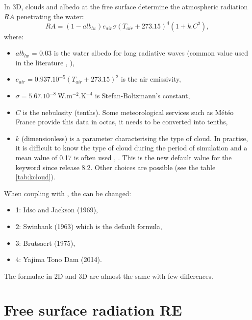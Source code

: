 In 3D, clouds and albedo at
the free surface determine the atmospheric radiation $RA$ penetrating the water:
\begin{equation*}
RA = (1-alb_{lw}) e_{air}\sigma(T_{air}+273.15)^{4}(1+k . C^{2}),
\end{equation*}
where:
\begin{itemize}
\item $alb_{lw}$ = 0.03 is the water albedo for long radiative waves
  (common value used in the literature \cite{imerito_dyresm_2007},
  \cite{henderson-sellers_energy_balance_1986}),
\item $e_{air} = 0.937.10^{-5}(T_{air}+273.15)^{2}$ is the air emissivity,
\item $\sigma= 5.67.10^{-8}~\mathrm{{W.m^{-2}.K^{-4}}}$ is Stefan-Boltzmann's constant,
\item $C$ is the nebulosity (tenths). Some meteorological services such as
M\'{e}t\'{e}o France provide this data in octas, it needs to be converted
into tenths,
\item $k$ (dimensionless) is a parameter characterising the type of
cloud. In practise, it is difficult to know the type of cloud during the
period of simulation and a mean value of 0.17 is often used \cite{tva_heat_1972},
\cite{imerito_dyresm_2007}.
This is the new default value for the keyword
 since release 8.2.
Other choices are possible
(see the table \ref{tab:kcloud}).
\end{itemize}

When coupling \waqtel with , the 
can be changed:
\begin{itemize}
\item 1: Idso and Jackson (1969),
\item 2: Swinbank (1963) which is the default formula,
\item 3: Brutsaert (1975),
\item 4: Yajima Tono Dam (2014).
\end{itemize}

The formulae in 2D and 3D are almost the same with few differences.


\section{Free surface radiation RE}

